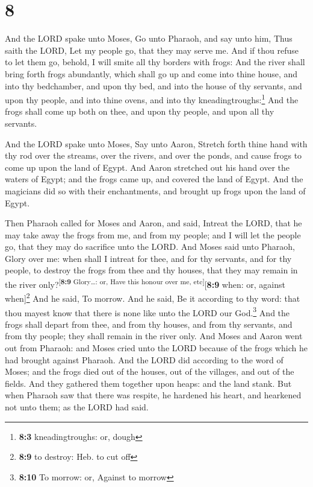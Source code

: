 \hypertarget{section-7}{%
\section{8}\label{section-7}}

 And the LORD spake unto Moses, Go unto Pharaoh, and say
unto him, Thus saith the LORD, Let my people go, that they may serve me.
 And if thou refuse to let them go, behold, I will smite
all thy borders with frogs:  And the river shall bring
forth frogs abundantly, which shall go up and come into thine house, and
into thy bedchamber, and upon thy bed, and into the house of thy
servants, and upon thy people, and into thine ovens, and into thy
kneadingtroughs:\footnote{\textbf{8:3} kneadingtroughs: or, dough}
 And the frogs shall come up both on thee, and upon thy
people, and upon all thy servants.

 And the LORD spake unto Moses, Say unto Aaron, Stretch
forth thine hand with thy rod over the streams, over the rivers, and
over the ponds, and cause frogs to come up upon the land of Egypt.
 And Aaron stretched out his hand over the waters of
Egypt; and the frogs came up, and covered the land of Egypt.
 And the magicians did so with their enchantments, and
brought up frogs upon the land of Egypt.

 Then Pharaoh called for Moses and Aaron, and said,
Intreat the LORD, that he may take away the frogs from me, and from my
people; and I will let the people go, that they may do sacrifice unto
the LORD.  And Moses said unto Pharaoh, Glory over me:
when shall I intreat for thee, and for thy servants, and for thy people,
to destroy the frogs from thee and thy houses, that they may remain in
the river only?\textsuperscript{{[}\textbf{8:9} Glory\ldots: or, Have
this honour over me, etc{]}}{[}\textbf{8:9} when: or, against
when{]}\footnote{\textbf{8:9} to destroy: Heb. to cut off}
 And he said, To morrow. And he said, Be it according to
thy word: that thou mayest know that there is none like unto the LORD
our God.\footnote{\textbf{8:10} To morrow: or, Against to morrow}
 And the frogs shall depart from thee, and from thy
houses, and from thy servants, and from thy people; they shall remain in
the river only.  And Moses and Aaron went out from
Pharaoh: and Moses cried unto the LORD because of the frogs which he had
brought against Pharaoh.  And the LORD did according to
the word of Moses; and the frogs died out of the houses, out of the
villages, and out of the fields.  And they gathered them
together upon heaps: and the land stank.  But when
Pharaoh saw that there was respite, he hardened his heart, and hearkened
not unto them; as the LORD had said.

